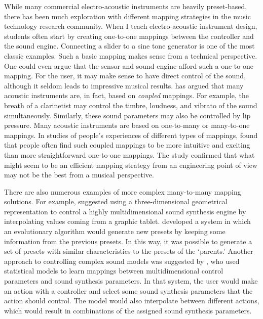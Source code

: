 While many commercial electro-acoustic instruments are heavily preset-based, there has been much exploration with different mapping strategies in the music technology research community.
When I teach electro-acoustic instrument design, students often start by creating one-to-one mappings between the controller and the sound engine. Connecting a slider to a sine tone generator is one of the most classic examples. Such a basic mapping makes sense from a technical perspective. One could even argue that the sensor and sound engine afford such a one-to-one mapping. For the user, it may make sense to have direct control of the sound, although it seldom leads to impressive musical results. \citet{kvifte_instruments_1989} has argued that many acoustic instruments are, in fact, based on \emph{coupled} mappings. For example, the breath of a clarinetist may control the timbre, loudness, and vibrato of the sound simultaneously. Similarly, these sound parameters may also be controlled by lip pressure. Many acoustic instruments are based on one-to-many or many-to-one mappings. In studies of people's experiences of different types of mappings, \citet{hunt_mapping_2002} found that people often find such coupled mappings to be more intuitive and exciting than more straightforward one-to-one mappings. The study confirmed that what might seem to be an efficient mapping strategy from an engineering point of view may not be the best from a musical perspective.

There are also numerous examples of more complex many-to-many mapping solutions. For example, \citet{momeni_characterizing_2003} suggested using a three-dimensional geometrical representation to control a highly multidimensional sound synthesis engine by interpolating values coming from a graphic tablet. \citet{dahlstedt_mutasynth_2001} developed a system in which an evolutionary algorithm would generate new presets by keeping some information from the previous presets. In this way, it was possible to generate a set of presets with similar characteristics to the presets of the `parents.' Another approach to controlling complex sound models was suggested by \citet{bevilacqua_gesture_2005}, who used statistical models to learn mappings between multidimensional control parameters and sound synthesis parameters. In that system, the user would make an action with a controller and select some sound synthesis parameters that the action should control. The model would also interpolate between different actions, which would result in combinations of the assigned sound synthesis parameters.

